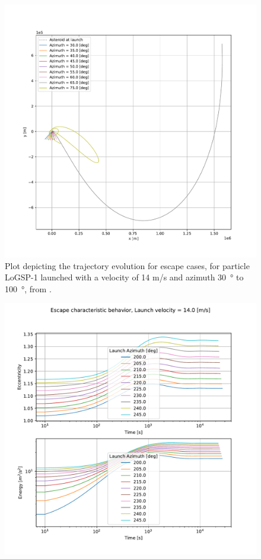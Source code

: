 \documentclass[print]{tudelft-report}
\begin{document}
\begin{appendices}
\begin{figure}[htb]
    \includegraphics[width=\textwidth, height=0.6\textheight, keepaspectratio=true]{Results/Images/leading_edge_perturbations/logsp1_escape_traj_14ms_solarPhase225.pdf}
    \caption{Plot depicting the trajectory evolution for escape cases, for particle LoGSP-1 launched with a velocity of 14 m/s and azimuth \SI{30}{\degree} to \SI{100}{\degree}, from \protect{}.}
    \label{fig:leadingEdge_logsp1_escape_traj_14ms_solar225}
    \end{figure}
    \FloatBarrier
    \begin{figure}[htb]
    \centering
    \captionsetup{justification=centering}
    \includegraphics[width=\textwidth, height=0.6\textheight, keepaspectratio=true]{Results/Images/leading_edge_perturbations/logsp1_escape_energy_ecc_14ms_200_to_250_azim_solarPhase225.pdf}

\end{figure}
\end{appendices}
\end{document}
